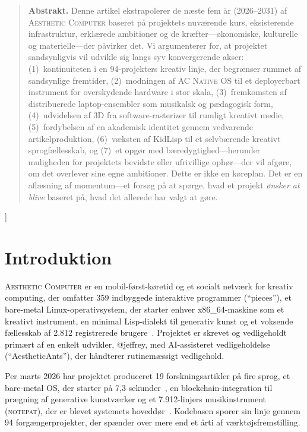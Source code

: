 \documentclass[10pt,letterpaper,twocolumn]{article}
\newcommand{\ac}{\textsc{Aesthetic Computer}}
\newcommand{\acos}{\textsc{AC Native OS}}
\newcommand{\np}{\textsc{notepat}}
\begin{document}
{\begin{quote}
\small\noindent\textbf{Abstrakt.}
Denne artikel ekstrapolerer de næste fem år (2026--2031) af \ac{} baseret på projektets nuværende kurs, eksisterende infrastruktur, erklærede ambitioner og de kræfter---økonomiske, kulturelle og materielle---der påvirker det. Vi argumenterer for, at projektet sandsynligvis vil udvikle sig langs syv konvergerende akser: (1)~kontinuiteten i en 94-projekters kreativ linje, der begrænser rummet af sandsynlige fremtider, (2)~modningen af \acos{} til et deployerbart instrument for overskydende hardware i stor skala, (3)~fremkomsten af distribuerede laptop-ensembler som musikalsk og pædagogisk form, (4)~udvidelsen af 3D fra software-rasterizer til rumligt kreativt medie, (5)~fordybelsen af en akademisk identitet gennem vedvarende artikelproduktion, (6)~væksten af KidLisp til et selvbærende kreativt sprogfællesskab, og (7)~et opgør med bæredygtighed---herunder muligheden for projektets bevidste eller ufrivillige ophør---der vil afgøre, om det overlever sine egne ambitioner. Dette er ikke en køreplan. Det er en aflæsning af momentum---et forsøg på at spørge, hvad et projekt \emph{ønsker at blive} baseret på, hvad det allerede har valgt at gøre.
\end{quote}
\vspace{0.5em}
}]


\section{Introduktion}

\ac{} er en mobil-først-køretid og et socialt netværk for kreativ computing, der omfatter 359 indbyggede interaktive programmer (``pieces''), et bare-metal Linux-operativsystem, der starter enhver x86\_64-maskine som et kreativt instrument, en minimal Lisp-dialekt til generativ kunst og et voksende fællesskab af 2.812 registrerede brugere~\citep{scudder2026ac}. Projektet er skrevet og vedligeholdt primært af en enkelt udvikler, @jeffrey, med AI-assisteret vedligeholdelse (``AestheticAnts''), der håndterer rutinemæssigt vedligehold.

Per marts 2026 har projektet produceret 19 forskningsartikler på fire sprog, et bare-metal OS, der starter på 7,3 sekunder~\citep{scudder2026os}, en blockchain-integration til prægning af generative kunstværker og et 7.912-linjers musikinstrument (\np{}), der er blevet systemets hoveddør~\citep{scudder2026notepat}. Kodebasen sporer sin linje gennem 94 forgængerprojekter, der spænder over mere end et årti af værktøjsfremstilling.
\end{document}
